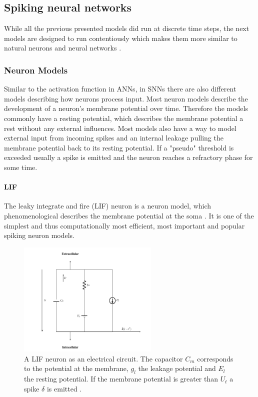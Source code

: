 \subsection{Spiking neural networks}

While all the previous presented models did run at discrete time steps, the next models are designed to run contentiously which makes them more similar to natural neurons and neural networks \cite{maass1997networks}. 

\subsubsection{Neuron Models}

Similar to the activation function in ANNs, in SNNs there are also different models describing how neurons process input.
Most neuron models describe the development of a neuron's membrane potential over time.
Therefore the models commonly have a resting potential, which describes the membrane potential a rest without any external influences. 
Most models also have a way to model external input from incoming spikes and an internal leakage pulling the membrane potential back to its resting potential. 
If a "pseudo" threshold is exceeded usually a spike is emitted and the neuron reaches a refractory phase for some time.

\paragraph{LIF}

The leaky integrate and fire (LIF) neuron is a neuron model, which phenomenological describes the membrane potential at the soma \cite{abbott1999lapicque}\cite{gerstner2014neuronal}\cite{Petrovici2016}. 
It is one of the simplest and thus computationally most efficient, most important and popular spiking neuron models.  

\begin{figure}
	\centering
    	\includegraphics[width=0.6\textwidth]{imgs/lif.png} 
    \caption{A LIF neuron as an electrical circuit. The capacitor $C_m$ corresponds to the potential at the membrane, $g_l$ the leakage potential and $E_l$ the resting potential. If the membrane potential is greater than $U_t$ a spike $\delta$ is emitted \cite{heikoMA}.}
	\label{fig:lif}
\end{figure}

